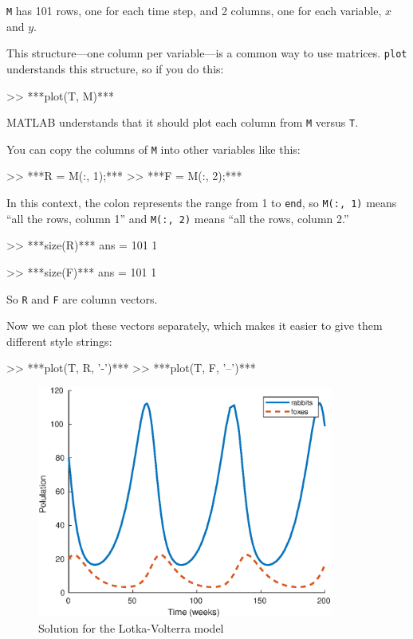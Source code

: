 \lstinline{M} has 101 rows, one for each time step, and 2 columns, one for each variable,
$x$ and $y$.

This structure---one column per variable---is a common way to
use matrices.  \lstinline{plot} understands this structure, so if you
do this:

\begin{code}
>> ***plot(T, M)***
\end{code}
MATLAB understands that it should plot each column from \lstinline{M}
versus \lstinline{T}.


You can copy the columns of \lstinline{M} into other variables like
this:

\begin{code}
>> ***R = M(:, 1);***
>> ***F = M(:, 2);***
\end{code}

In this context, the colon represents the range from 1 to \lstinline{end},
so \lstinline{M(:, 1)} means ``all the rows, column 1'' and
\lstinline{M(:, 2)} means ``all the rows, column 2.''

\begin{code}
>> ***size(R)***
ans = 101     1

>> ***size(F)***
ans = 101     1
\end{code}

So \lstinline{R} and \lstinline{F} are column vectors.


Now we can plot these vectors separately, which makes it easier to give them different style strings:

\begin{code}
>> ***plot(T, R, '-')***
>> ***plot(T, F, '--')***
\end{code}

\begin{figure}[ht]
\centerline{\includegraphics[height=3in]{book/figs/lotka.eps}}
\caption{Solution for the Lotka-Volterra model}
\label{fig:lotka}
\end{figure}

